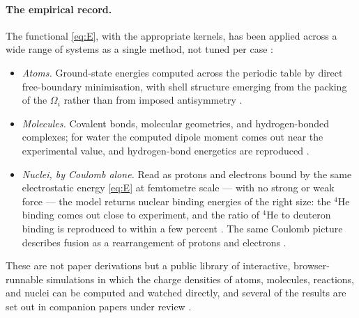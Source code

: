 \documentclass[11pt]{article}
\begin{document}
\paragraph{The empirical record.} The functional \eqref{eq:E}, with the appropriate kernels, has been
applied across a wide range of systems as a single method, not tuned per case
\cite{RealQM,RealQMatoms,RealQMgallery}:
\begin{itemize}
\item \emph{Atoms.} Ground-state energies computed across the periodic table by direct free-boundary
minimisation, with shell structure emerging from the packing of the $\Omega_i$ rather than from imposed
antisymmetry \cite{RealQMatoms}.
\item \emph{Molecules.} Covalent bonds, molecular geometries, and hydrogen-bonded complexes; for water the
computed dipole moment comes out near the experimental value, and hydrogen-bond energetics are reproduced
\cite{RealQM,RealQMgallery}.
\item \emph{Nuclei, by Coulomb alone.} Read as protons and electrons bound by the same electrostatic energy
\eqref{eq:E} at femtometre scale --- with no strong or weak force --- the model returns nuclear binding
energies of the right size: the $^4$He binding comes out close to experiment, and the ratio of $^4$He to
deuteron binding is reproduced to within a few percent \cite{RealNucleus,QCDBinding}. The same Coulomb
picture describes fusion as a rearrangement of protons and electrons \cite{SolarFusion}.
\end{itemize}
These are not paper derivations but a public library of interactive, browser-runnable simulations
\cite{RealQMgallery} in which the charge densities of atoms, molecules, reactions, and nuclei can be
computed and watched directly, and several of the results are set out in companion papers under review
\cite{RealQMatoms,RealNucleus,QCDBinding,SolarFusion}.
\end{document}
